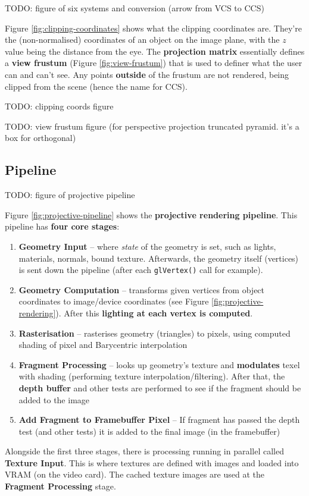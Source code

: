 \documentclass{article}
\begin{document}
TODO: figure of six systems and conversion (arrow from VCS to CCS)

Figure \ref{fig:clipping-coordinates} shows what the clipping coordinates are. They're the (non-normalised) coordinates of an object on the image plane, with the $z$ value being the distance from the eye. The \textbf{projection matrix} essentially defines a \textbf{view frustum} (Figure \ref{fig:view-frustum}) that is used to definer what the user can and can't see. Any points \textbf{outside} of the frustum are not rendered, being clipped from the scene (hence the name for CCS).

TODO: clipping coords figure

TODO: view frustum figure (for perspective projection truncated pyramid. it's a box for orthogonal)

\subsection{Pipeline}

TODO: figure of projective pipeline

Figure \ref{fig:projective-pipeline} shows the \textbf{projective rendering pipeline}. This pipeline has \textbf{four core stages}:
\begin{enumerate}
	\item \textbf{Geometry Input} -- where \textit{state} of the geometry is set, such as lights, materials, normals, bound texture. Afterwards, the geometry itself (vertices) is sent down the pipeline (after each \texttt{glVertex()} call for example).
	\item \textbf{Geometry Computation} -- transforms given vertices from object coordinates  to image/device coordinates (see Figure \ref{fig:projective-rendering}). After this \textbf{lighting at each vertex is computed}.
	\item \textbf{Rasterisation} -- rasterises geometry (triangles) to pixels, using computed shading of pixel and Barycentric interpolation
	\item \textbf{Fragment Processing} -- looks up geometry's texture and \textbf{modulates} texel with shading (performing texture interpolation/filtering). After that, the \textbf{depth buffer} and other tests are performed to see if the fragment should be added to the image
	\item \textbf{Add Fragment to Framebuffer Pixel} -- If fragment has passed the depth test (and other tests) it is added to the final image (in the framebuffer)
\end{enumerate}
Alongside the first three stages, there is processing running in parallel called \textbf{Texture Input}. This is where textures are defined with images and loaded into VRAM (on the video card). The cached texture images are used at the \textbf{Fragment Processing} stage. 
\end{document}
